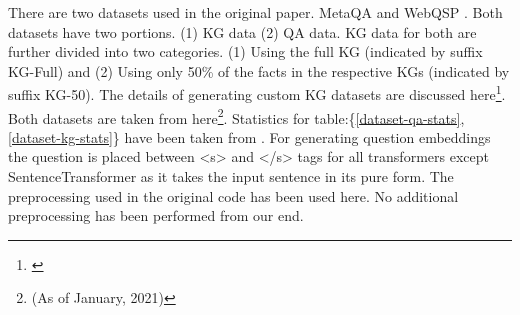 There are two datasets used in the original paper. MetaQA \cite{metaqa-dataset} and WebQSP \cite{webqsp-dataset}. Both datasets have two portions. (1) KG data (2) QA data. KG data for both are further divided into two categories. (1) Using the full KG (indicated by suffix KG-Full) and (2) Using only 50\% of the facts in the respective KGs (indicated by suffix KG-50). The details of generating custom KG datasets are discussed here\footnote{\label{embedKGQAgit}\embedKGQAgit}. Both datasets are taken from here\footnote{\shareddatasetlink \hspace{.1cm} (As of January, 2021)}. Statistics for table:\{\ref{dataset-qa-stats}, \ref{dataset-kg-stats}\} have been taken from \cite{saxena-etal-2020-improving}. For generating question embeddings the question is placed between <s> and </s> tags for all transformers except SentenceTransformer as it takes the input sentence in its pure form. The preprocessing used in the original code has been used here. No additional preprocessing has been performed from our end. 

